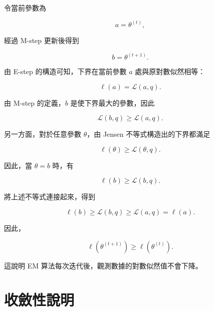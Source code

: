令當前參數為

\begin{equation}\label{eq-a-theta}
a=\theta^{(t)},
\end{equation}

經過 M-step 更新後得到

\begin{equation}\label{eq-b-theta}
b=\theta^{(t+1)}.
\end{equation}

由 E-step 的構造可知，下界在當前參數 \(a\) 處與原對數似然相等：

\begin{equation}\label{eq-proof-step-1}
\ell(a)
=
\mathcal{L}(a,q).
\end{equation}

由 M-step 的定義，\(b\) 是使下界最大的參數，因此

\begin{equation}\label{eq-proof-step-2}
\mathcal{L}(b,q)
\ge
\mathcal{L}(a,q).
\end{equation}

另一方面，對於任意參數 \(\theta\)，由 Jensen 不等式構造出的下界都滿足

\begin{equation}\label{eq-proof-step-3}
\ell(\theta)
\ge
\mathcal{L}(\theta,q).
\end{equation}

因此，當 \(\theta=b\) 時，有

\begin{equation}\label{eq-proof-step-4}
\ell(b)
\ge
\mathcal{L}(b,q).
\end{equation}

將上述不等式連接起來，得到

\begin{equation}\label{eq-proof-chain}
\ell(b)
\ge
\mathcal{L}(b,q)
\ge
\mathcal{L}(a,q)
=
\ell(a).
\end{equation}

因此，

\begin{equation}\label{eq-monotonicity}
\ell(\theta^{(t+1)})
\ge
\ell(\theta^{(t)}).
\end{equation}

這說明 EM 算法每次迭代後，觀測數據的對數似然值不會下降。

\section{收斂性說明}

